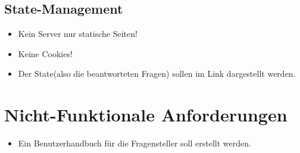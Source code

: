 \documentclass[12pt,pdftex,a4paper]{article}
\begin{document}
\subsection{State-Management}
\begin{itemize}
 \item Kein Server nur statische Seiten!
 \item Keine Cookies!
 \item Der State(also die beantworteten Fragen) sollen im Link dargestellt werden.
\end{itemize}
\section{Nicht-Funktionale Anforderungen}
\begin{itemize}
 \item Ein Benutzerhandbuch für die Fragensteller soll erstellt werden.
\end{itemize}
\end{document}
